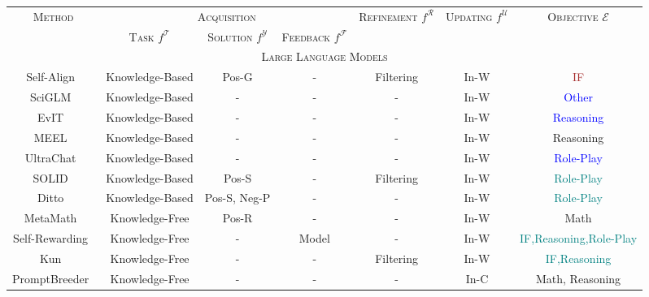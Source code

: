 \documentclass[sn-basic, Numbered]{sn-jnl}%
\def\gE{{\mathcal{E}}}
\def\gF{{\mathcal{F}}}
\def\gR{{\mathcal{R}}}
\def\gT{{\mathcal{T}}}
\def\gU{{\mathcal{U}}}
\def\gY{{\mathcal{Y}}}
\theoremstyle{thmstyleone}%
\theoremstyle{thmstyletwo}%
\theoremstyle{thmstylethree}%
\begin{document}
\begin{table}
\centering 
\setlength{\tabcolsep}{1mm}
\scriptsize
\begin{tabular}{ccccccc}
\toprule 
    \multirow{2}{*}{\textsc{Method}} & \multicolumn{3}{c}{\textsc{Acquisition}} & \multirow{2}{*}{\textsc{Refinement} $f^{\gR}$} & \multirow{2}{*}{\textsc{Updating} $f^{\gU}$} & \multirow{2}{*}{\textsc{Objective} $\gE$} \\
\cmidrule{2-4}
 & \textsc{Task} $f^{\gT}$ & \textsc{Solution} $f^{\gY}$ & \textsc{Feedback} $f^{\gF}$ & & & \\
\midrule 
\multicolumn{7}{c}{\textsc{Large Language Models}}\\
\midrule
    Self-Align~\cite{sun2024principle}    & Knowledge-Based  & Pos-G    & -          & Filtering   & In-W       & \textcolor{brown}{IF}       \\
SciGLM~\cite{zhang2024sciglm}         & Knowledge-Based  & -        & -          & -           & In-W       & \textcolor{blue}{Other}             \\
EvIT~\cite{tao2024evit}               & Knowledge-Based  & -        & -          & -           & In-W       & \textcolor{blue}{Reasoning}        \\
MEEL~\cite{tao2024meel}               & Knowledge-Based  & -        & -          & -           & In-W       & Reasoning         \\
UltraChat~\cite{ding2023enhancing}& Knowledge-Based & -    & -          & -           & In-W       & \textcolor{blue}{Role-Play}   \\
SOLID~\cite{askari2024self}           & Knowledge-Based  & Pos-S    & -          & Filtering   & In-W       & \textcolor{teal}{Role-Play}         \\
Ditto~\cite{lu2024large}              & Knowledge-Based  & Pos-S, Neg-P & -    & -           & In-W       & \textcolor{teal}{Role-Play}         \\
MetaMath~\cite{yu2023metamath}        & Knowledge-Free   & Pos-R    & -          & -           & In-W       & Math              \\
Self-Rewarding~\cite{yuan2024self}    & Knowledge-Free   & -        & Model      & -           & In-W       & \textcolor{teal}{IF,Reasoning,Role-Play}                \\
Kun~\cite{zheng2024kun}               & Knowledge-Free   & -        & -          & Filtering   & In-W       & \textcolor{teal}{IF,Reasoning}                \\
PromptBreeder~\cite{fernando2023promptbreeder} & Knowledge-Free & -    & -          & -           & In-C       & Math, Reasoning   \\

\end{tabular}
\end{table}
\end{document}
